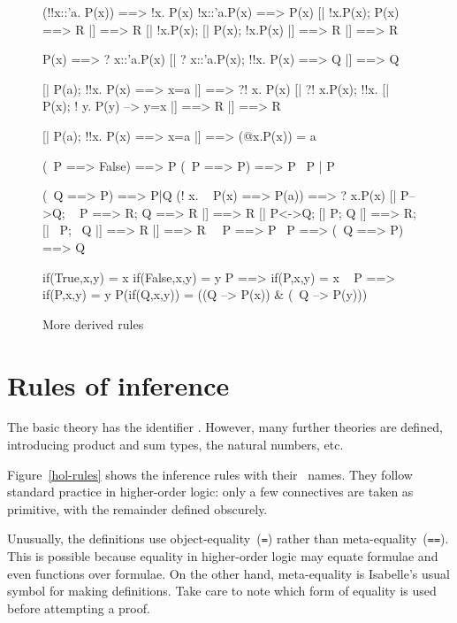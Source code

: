 \begin{figure} \makeatother
\begin{ttbox}
      (!!x::'a. P(x)) ==> !x. P(x)
      !x::'a.P(x) ==> P(x)
      [| !x.P(x);  P(x) ==> R |] ==> R
  [| !x.P(x);  [| P(x); !x.P(x) |] ==> R |] ==> R

       P(x) ==> ? x::'a.P(x)
       [| ? x::'a.P(x); !!x. P(x) ==> Q |] ==> Q

      [| P(a);  !!x. P(x) ==> x=a |] ==> ?! x. P(x)
      [| ?! x.P(x);  !!x. [| P(x);  ! y. P(y) --> y=x |] ==> R 
          |] ==> R

  [| P(a);  !!x. P(x) ==> x=a |] ==> (@x.P(x)) = a

             (~P ==> False) ==> P
          (~P ==> P) ==> P
    ~P | P

    (~Q ==> P) ==> P|Q
      (! x. ~ P(x) ==> P(a)) ==> ? x.P(x)
     [| P-->Q; ~ P ==> R; Q ==> R |] ==> R
     [| P<->Q;  [| P; Q |] ==> R;  [| ~P; ~Q |] ==> R |] ==> R
   ~~P ==> P
      ~P ==> (~Q ==> P) ==> Q

    if(True,x,y) = x
   if(False,x,y) = y
       P ==> if(P,x,y) = x
   ~ P ==> if(P,x,y) = y
  P(if(Q,x,y)) = ((Q --> P(x)) & (~Q --> P(y)))
\end{ttbox}
\caption{More derived rules} \label{hol-lemmas2}
\end{figure}


\section{Rules of inference}
The basic theory has the {\ML} identifier .  However,
many further theories are defined, introducing product and sum types, the
natural numbers, etc.

Figure~\ref{hol-rules} shows the inference rules with their~{\ML} names.
They follow standard practice in higher-order logic: only a few connectives
are taken as primitive, with the remainder defined obscurely.  

Unusually, the definitions use object-equality~({\tt=}) rather than
meta-equality~({\tt==}).  This is possible because equality in higher-order
logic may equate formulae and even functions over formulae.  On the other
hand, meta-equality is Isabelle's usual symbol for making definitions.
Take care to note which form of equality is used before attempting a proof.

